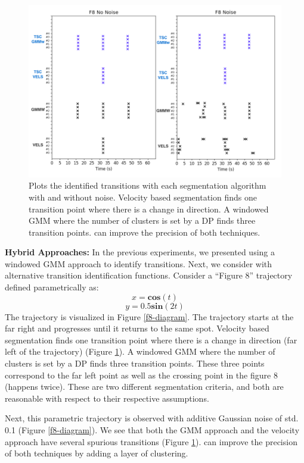 \begin{figure}[ht!]%
\centering
\includegraphics[width=\columnwidth]{tsc-experiments/hybrid_approach.png}
\caption{Plots the identified transitions with each segmentation algorithm with and without noise. Velocity based segmentation finds one transition point where there is a change in direction. A windowed GMM where the number of clusters is set by a DP finds three transition points. \tsc can improve the precision of both techniques.  \label{f8-results}}
\end{figure}


\textbf{Hybrid Approaches: } In the previous experiments, we presented \tsc using a windowed GMM approach to identify transitions. Next, we consider \tsc with alternative transition identification functions.
Consider a ``Figure 8'' trajectory defined parametrically as:
\[
x = \textbf{cos}(t)
\]
\[
y = 0.5\textbf{sin}(2t)
\]
The trajectory is visualized in Figure \ref{f8-diagram}. The trajectory starts at the far right and progresses until it returns to the same spot. Velocity based segmentation finds one transition point where there is a change in direction (far left of the trajectory) (Figure \ref{f8-results}). 
A windowed GMM where the number of clusters is set by a DP finds three transition points. 
These three points correspond to the far left point as well as the crossing point in the figure 8 (happens twice).
These are two different segmentation criteria, and both are reasonable with respect to their respective assumptions.

Next, this parametric trajectory is observed with additive Gaussian noise of std. 0.1 (Figure \ref{f8-diagram}).
We see that both the GMM approach and the velocity approach have several spurious transitions (Figure \ref{f8-results}).
\tsc can improve the precision of both techniques by adding a layer of clustering.

